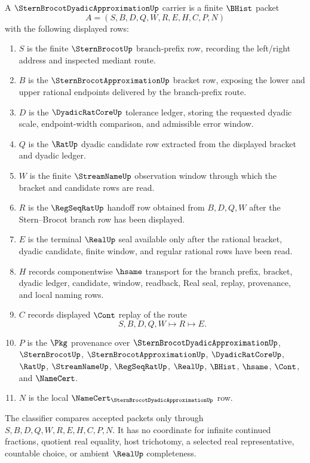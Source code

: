 \begin{definition}
\label{def:stern-brocot-dyadic-approximation-carrier}
A $\SternBrocotDyadicApproximationUp$ carrier is a finite $\BHist$ packet
$$
A=(S,B,D,Q,W,R,E,H,C,P,N)
$$
with the following displayed rows:
\begin{enumerate}
\item $S$ is the finite $\SternBrocotUp$ branch-prefix row, recording the left/right address and inspected mediant route.
\item $B$ is the $\SternBrocotApproximationUp$ bracket row, exposing the lower and upper rational endpoints delivered by the branch-prefix route.
\item $D$ is the $\DyadicRatCoreUp$ tolerance ledger, storing the requested dyadic scale, endpoint-width comparison, and admissible error window.
\item $Q$ is the $\RatUp$ dyadic candidate row extracted from the displayed bracket and dyadic ledger.
\item $W$ is the finite $\StreamNameUp$ observation window through which the bracket and candidate rows are read.
\item $R$ is the $\RegSeqRatUp$ handoff row obtained from $B,D,Q,W$ after the Stern--Brocot branch row has been displayed.
\item $E$ is the terminal $\RealUp$ seal available only after the rational bracket, dyadic candidate, finite window, and regular rational rows have been read.
\item $H$ records componentwise $\hsame$ transport for the branch prefix, bracket, dyadic ledger, candidate, window, readback, Real seal, replay, provenance, and local naming rows.
\item $C$ records displayed $\Cont$ replay of the route
$$
S,B,D,Q,W \longmapsto R \longmapsto E .
$$
\item $P$ is the $\Pkg$ provenance over $\SternBrocotDyadicApproximationUp$, $\SternBrocotUp$, $\SternBrocotApproximationUp$, $\DyadicRatCoreUp$, $\RatUp$, $\StreamNameUp$, $\RegSeqRatUp$, $\RealUp$, $\BHist$, $\hsame$, $\Cont$, and $\NameCert$.
\item $N$ is the local $\NameCert_{\SternBrocotDyadicApproximationUp}$ row.
\end{enumerate}
The classifier compares accepted packets only through $S,B,D,Q,W,R,E,H,C,P,N$. It has no coordinate for infinite continued fractions, quotient real equality, host trichotomy, a selected real representative, countable choice, or ambient $\RealUp$ completeness.
\end{definition}

